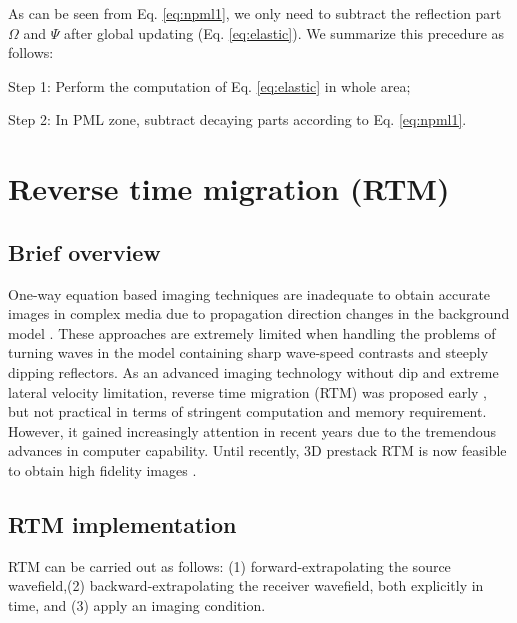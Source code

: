 As can be seen from Eq. \eqref{eq:npml1}, we only need to subtract the reflection part $\Omega$ and $\Psi$ after global updating (Eq. \eqref{eq:elastic}). We summarize this precedure as follows:

Step 1: Perform the computation of Eq. \eqref{eq:elastic} in whole area;

Step 2: In PML zone, subtract decaying parts according to Eq. \eqref{eq:npml1}.




\section{Reverse time migration (RTM)}

\subsection{Brief overview}


One-way equation based imaging techniques are inadequate to obtain accurate images in complex media due to propagation direction changes in the background model \citep{biondi20063d}. These approaches are extremely limited when handling the problems of turning waves in the model containing sharp wave-speed contrasts and steeply dipping reflectors. As an advanced imaging technology without dip and extreme lateral velocity limitation, reverse time migration (RTM) was proposed early  \citep{baysal1983reverse,m1983migration}, but not practical in terms of stringent computation and memory requirement.
However, it gained increasingly attention in recent years due to the tremendous advances in computer capability. Until recently, 3D prestack RTM is now feasible to obtain high fidelity images \citep{yoon20033d,guitton2006least}.


\subsection{RTM implementation}


RTM can be carried out as follows: (1) forward-extrapolating the source wavefield,(2) backward-extrapolating the receiver wavefield, both explicitly in time, and (3) apply an imaging condition.

